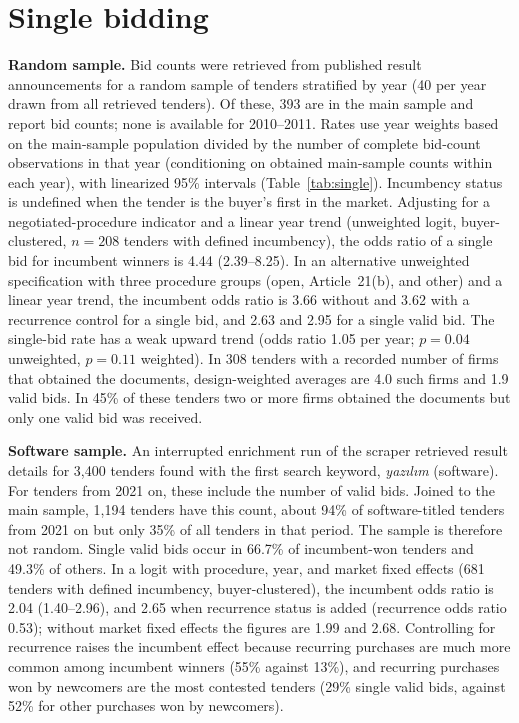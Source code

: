 \documentclass[11pt,a4paper]{article}
\begin{document}
\section{Single bidding}
\textbf{Random sample.} Bid counts were retrieved from published result announcements for a random sample of tenders stratified by year (40 per year drawn from all retrieved tenders). Of these, 393 are in the main sample and report bid counts; none is available for 2010--2011. Rates use year weights based on the main-sample population divided by the number of complete bid-count observations in that year (conditioning on obtained main-sample counts within each year), with linearized 95\% intervals (Table~\ref{tab:single}). Incumbency status is undefined when the tender is the buyer's first in the market. Adjusting for a negotiated-procedure indicator and a linear year trend (unweighted logit, buyer-clustered, $n=208$ tenders with defined incumbency), the odds ratio of a single bid for incumbent winners is 4.44 (2.39--8.25). In an alternative unweighted specification with three procedure groups (open, Article~21(b), and other) and a linear year trend, the incumbent odds ratio is 3.66 without and 3.62 with a recurrence control for a single bid, and 2.63 and 2.95 for a single valid bid. The single-bid rate has a weak upward trend (odds ratio 1.05 per year; $p=0.04$ unweighted, $p=0.11$ weighted). In 308 tenders with a recorded number of firms that obtained the documents, design-weighted averages are 4.0 such firms and 1.9 valid bids. In 45\% of these tenders two or more firms obtained the documents but only one valid bid was received.

\begin{table}[h]\centering\small\caption{Single-bid rates (design-weighted random sample).}\label{tab:single}\end{table}

\textbf{Software sample.} An interrupted enrichment run of the scraper retrieved result details for 3,400 tenders found with the first search keyword, \emph{yazılım} (software). For tenders from 2021 on, these include the number of valid bids. Joined to the main sample, 1,194 tenders have this count, about 94\% of software-titled tenders from 2021 on but only 35\% of all tenders in that period. The sample is therefore not random. Single valid bids occur in 66.7\% of incumbent-won tenders and 49.3\% of others. In a logit with procedure, year, and market fixed effects (681 tenders with defined incumbency, buyer-clustered), the incumbent odds ratio is 2.04 (1.40--2.96), and 2.65 when recurrence status is added (recurrence odds ratio 0.53); without market fixed effects the figures are 1.99 and 2.68. Controlling for recurrence raises the incumbent effect because recurring purchases are much more common among incumbent winners (55\% against 13\%), and recurring purchases won by newcomers are the most contested tenders (29\% single valid bids, against 52\% for other purchases won by newcomers).
\end{document}
